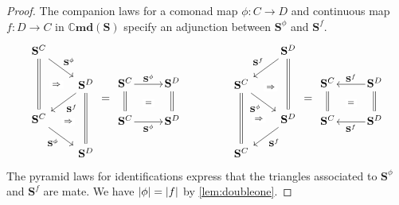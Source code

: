 \documentclass[11pt, oneside, article]{memoir}
\theoremstyle{plain}
\theoremstyle{definition}
\theoremstyle{remark}
\DeclarePairedDelimiter{\abs}{\lvert}{\rvert}
\newcommand{\namedcat}[1]{\mathbf{#1}}
\newcommand{\cat}[1]{\mathbf{#1}}
\newcommand{\Cmd}{\mathbb{C}\namedcat{md}}
\newcommand{\CoalgOn}[2]{{#2}^{#1}}
\newcommand{\CoalgS}[1]{\CoalgOn{#1}{\bS}}
\newcommand{\pts}[1]{{\abs{#1}}}
\newcommand{\one}[1]{\pts{#1}}
\newcommand{\com}[2]{{#1}^{#2}}
\newcommand{\con}[2]{{#1}^{#2}}
\newcommand{\cmnd}[1]{{#1}}
\newcommand{\cC}{\cmnd{C}}
\newcommand{\cD}{\cmnd{D}}
\newcommand{\bS}{\cat{S}}
\newcommand{\CS}{\CoalgS{\cC}}
\newcommand{\DS}{\CoalgS{\cD}}
\begin{document}
\begin{proof}
  The companion laws for a comonad map $\phi \colon \cC \to \cD$
  and continuous map $f \colon \cD \to \cC$ in $\Cmd(\bS)$
  specify an adjunction between $\com{\bS}{\phi}$ and $\con{\bS}{f}$.
  \[
    \begin{tikzcd}[column sep=20, row sep=15]
      \CS & \\
      & \DS \\
      \CS \\
      & \DS
      \arrow["{\com{\bS}{\phi}}", from=1-1, to=2-2]
      \arrow[""{name=0, anchor=center, inner sep=0}, equals, from=1-1, to=3-1]
      \arrow["{\con{\bS}{f}}", from=2-2, to=3-1]
      \arrow["{\com{\bS}{\phi}}"', from=3-1, to=4-2]
      \arrow[""{name=1, anchor=center, inner sep=0}, equals, from=4-2, to=2-2]
      \arrow["\Rightarrow"{description}, draw=none, from=0, to=2-2]
      \arrow["\Rightarrow"{description}, shift right, draw=none, from=3-1, to=1]
    \end{tikzcd}
    =
    \begin{tikzcd}[column sep=20]
      \CS & \DS \\
      \CS & \DS
      \arrow[""{name=0, anchor=center, inner sep=0}, shorten=-3pt, "{\com{\bS}{\phi}}", from=1-1, to=1-2]
      \arrow[equals, from=1-2, to=2-2]
      \arrow[equals, from=2-1, to=1-1]
      \arrow[""{name=1, anchor=center, inner sep=0}, shorten=-3pt, "{\com{\bS}{\phi}}"', from=2-1, to=2-2]
      \arrow["{=}"{description}, draw=none, from=1, to=0]
    \end{tikzcd}
    \qquad\qquad
    \begin{tikzcd}[column sep=20, row sep=15]
      & \DS \\
      \CS \\
      & \DS \\
      \CS
      \arrow["{\con{\bS}{f}}"', from=1-2, to=2-1]
      \arrow["{\com{\bS}{\phi}}"', from=2-1, to=3-2]
      \arrow[""{name=0, anchor=center, inner sep=0}, equals, from=2-1, to=4-1]
      \arrow[""{name=1, anchor=center, inner sep=0}, equals, from=3-2, to=1-2]
      \arrow["{\con{\bS}{f}}", from=3-2, to=4-1]
      \arrow["\Rightarrow"{description}, shift right, draw=none, from=2-1, to=1]
      \arrow["\Rightarrow"{description}, draw=none, from=0, to=3-2]
    \end{tikzcd}
    =
    \begin{tikzcd}[column sep=20]
      \CS & \DS \\
      \CS & \DS
      \arrow[""{name=0, anchor=center, inner sep=0}, shorten=-3pt, "{\con{\bS}{f}}"', from=1-2, to=1-1]
      \arrow[equals, from=1-2, to=2-2]
      \arrow[equals, from=2-1, to=1-1]
      \arrow[""{name=1, anchor=center, inner sep=0}, shorten=-3pt, "{\con{\bS}{f}}", from=2-2, to=2-1]
      \arrow["{=}"{description}, draw=none, from=1, to=0]
    \end{tikzcd}
  \]
  The pyramid laws for identifications express that the triangles
  associated to $\com{\bS}{\phi}$ and $\con{\bS}{f}$ are
  mate. We have $\one{\phi} = \one{f}$ by \cref{lem:doubleone}.
\end{proof}
\end{document}
